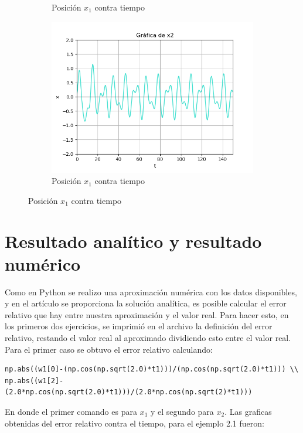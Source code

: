 \documentclass[12pt]{article}
\begin{document}
\begin{figure}[h!]
\begin{subfigure}{.55\textwidth}
  \caption{Posición $x_1$ contra tiempo}
  \label{fig:sfig2}
\end{subfigure}
\begin{subfigure}{.55\textwidth}
  \centering
  \includegraphics[width=.8\linewidth]{Ej4_14.png}
  \caption{Posición $x_1$ contra tiempo}
  \label{fig:sfig2}
\end{subfigure}
\end{figure}

\pagebreak

\section{Resultado analítico y resultado numérico}
Como en Python se realizo una aproximación numérica con los datos disponibles, y en el artículo se proporciona la solución analítica, es posible calcular el error relativo que hay entre nuestra aproximación y el valor real. Para hacer esto, en los primeros dos ejercicios, se imprimió en el archivo la definición del error relativo, restando el valor real al aproximado dividiendo esto entre el valor real. \\

Para el primer caso se obtuvo el error relativo calculando:

\begin{verbatim}
np.abs((w1[0]-(np.cos(np.sqrt(2.0)*t1)))/(np.cos(np.sqrt(2.0)*t1))) \\
np.abs((w1[2]-(2.0*np.cos(np.sqrt(2.0)*t1)))/(2.0*np.cos(np.sqrt(2)*t1)))
\end{verbatim}

En donde el primer comando es para $x_1$ y el segundo para $x_2$. Las graficas obtenidas del error relativo contra el tiempo, para el ejemplo 2.1 fueron:
\end{document}

